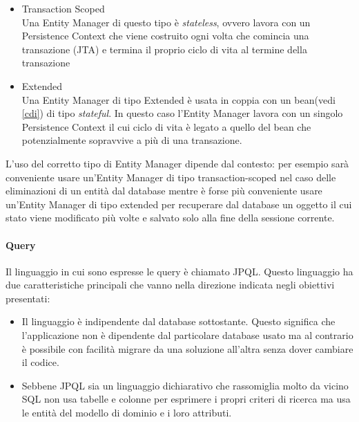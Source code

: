 \begin{itemize}
 \item Transaction Scoped\\
 Una Entity Manager di questo tipo è \textsl{stateless}, ovvero lavora con un Persistence Context che viene costruito ogni volta che comincia una transazione (JTA) e termina il proprio ciclo di vita al termine della transazione
 \item Extended\\
  Una Entity Manager di tipo Extended è usata in coppia con un bean(vedi \ref{cdi}) di tipo \textsl{stateful}. In questo caso l'Entity Manager lavora con un singolo Persistence Context il cui ciclo di vita è legato a quello del bean che potenzialmente sopravvive
  a più di una transazione.
\end{itemize}

L'uso del corretto tipo di Entity Manager dipende dal contesto: per esempio sarà conveniente usare un'Entity Manager di tipo transaction-scoped nel caso delle eliminazioni di un entità dal database mentre è forse più conveniente usare un'Entity
Manager di tipo extended per recuperare dal database un oggetto il cui stato viene modificato più volte e salvato solo alla fine della sessione corrente.


\paragraph{Query}
Il linguaggio in cui sono espresse le query è chiamato JPQL. Questo linguaggio ha due caratteristiche principali che vanno nella direzione indicata negli obiettivi presentati:

\begin{itemize}
 \item Il linguaggio è indipendente dal database sottostante. Questo significa che l'applicazione non è dipendente dal particolare database usato ma al contrario è possibile con facilità migrare da una soluzione all'altra senza dover cambiare
  il codice.
  \item Sebbene JPQL sia un linguaggio dichiarativo che rassomiglia molto da vicino SQL non usa tabelle e colonne per esprimere i propri criteri di ricerca ma usa le entità del modello di dominio e i loro attributi.
\end{itemize}




